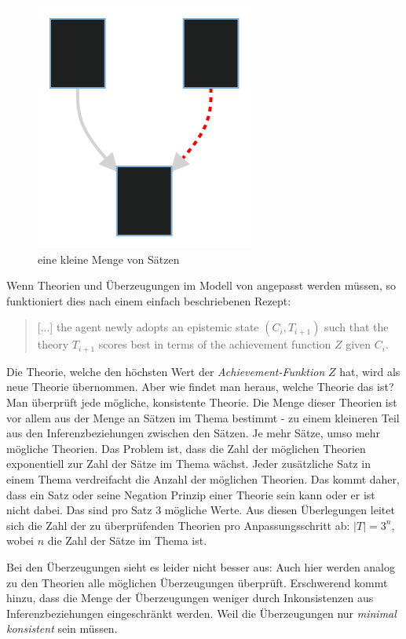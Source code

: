 \documentclass{article}
\begin{document}
\begin{figure}[h]
  \centering
  \includegraphics{figure1}
  \caption{eine kleine Menge von Sätzen\label{fig:smallset}}
\end{figure}

Wenn Theorien und Überzeugungen im Modell von \citeauthor{beisbart_making_2015} angepasst werden müssen, so funktioniert dies nach einem einfach beschriebenen Rezept:

\begin{quote}
    [...] the agent newly adopts an epistemic state $(C_i, T_{i+1})$ such that the theory $T_{i+1}$ scores best in terms of the achievement function $Z$ given $C_i$. \autocite[S.~11]{beisbart_making_2015}
\end{quote}

Die Theorie, welche den höchsten Wert der \textit{Achievement-Funktion} $Z$ hat, wird als neue Theorie übernommen. Aber wie findet man heraus, welche Theorie das ist? Man überprüft jede mögliche, konsistente Theorie. Die Menge dieser Theorien ist vor allem aus der Menge an Sätzen im Thema bestimmt - zu einem kleineren Teil aus den Inferenzbeziehungen zwischen den Sätzen. Je mehr Sätze, umso mehr mögliche Theorien. Das Problem ist, dass die Zahl der möglichen Theorien exponentiell zur Zahl der Sätze im Thema wächst. Jeder zusätzliche Satz in einem Thema verdreifacht die Anzahl der möglichen Theorien. Das kommt daher, dass ein Satz oder seine Negation Prinzip einer Theorie sein kann oder er ist nicht dabei. Das sind pro Satz 3 mögliche Werte. Aus diesen Überlegungen leitet sich die Zahl der zu überprüfenden Theorien pro Anpassungsschritt ab: $\lvert T \rvert = 3^n$, wobei $n$ die Zahl der Sätze im Thema ist.

Bei den Überzeugungen sieht es leider nicht besser aus: Auch hier werden analog zu den Theorien alle möglichen Überzeugungen überprüft. Erschwerend kommt hinzu, dass die Menge der Überzeugungen weniger durch Inkonsistenzen aus Inferenzbeziehungen eingeschränkt werden. Weil die Überzeugungen nur \textit{minimal konsistent} sein müssen.
\end{document}
